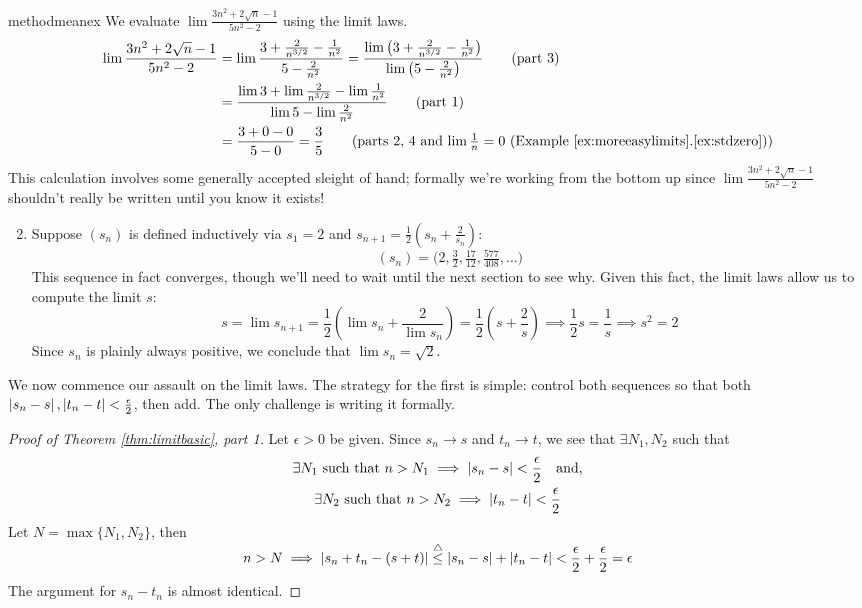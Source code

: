 \begin{examples}{}{methodmeanex}
\exstart We evaluate $\lim\frac{3n^2+2\sqrt n-1}{5n^2-2}$ using the limit laws.
\begin{align*}
\lim\frac{3n^2+2\sqrt n-1}{5n^2-2}&=\lim\frac{3+\frac 2{n^{3/2}}-\frac 1{n^2}}{5-\frac 2{n^2}} =\frac{\lim\left(3+\frac 2{n^{3/2}}-\frac 1{n^2}\right)}{\lim\left(5-\frac 2{n^2}\right)}\tag{part 3}\\
&=\frac{\lim 3+\lim\frac 2{n^{3/2}}-\lim\frac 1{n^2}}{\lim 5-\lim\frac 2{n^2}}\tag{part 1}\\
&=\frac{3+0-0}{5-0}=\frac 35\tag*{(parts 2, 4 and $\lim\frac 1n=0$ (Example \ref*{ex:moreeasylimits}.\ref{ex:stdzero}))}
\end{align*}
This calculation involves some generally accepted sleight of hand; formally we're working from the bottom up since $\lim\frac{3n^2+2\sqrt n-1}{5n^2-2}$ shouldn't really be written until you know it exists!

\goodbreak

\begin{enumerate}\setcounter{enumi}{1}
  \item\label{ex:methodmeanex2} Suppose $(s_n)$ is defined inductively via $s_1=2$ and $s_{n+1}=\frac 12(s_n+\frac 2{s_n})$:
\[(s_n)=\bigl(2,\tfrac 32,\tfrac{17}{12},\tfrac{577}{408},\ldots\bigr)\]
This sequence in fact converges, though we'll need to wait until the next section to see why. Given this fact, the limit laws allow us to compute the limit $s$:
\[s=\lim s_{n+1}=\frac 12\left(\lim s_n+\frac 2{\lim s_n}\right) =\frac 12\left(s+\frac 2s\right) \implies \frac 12s=\frac 1s\implies s^2=2\]
Since $s_n$ is plainly always positive, we conclude that $\lim s_n=\sqrt 2$.
\end{enumerate}
\end{examples}

\medskip

We now commence our assault on the limit laws. The strategy for the first is simple: control both sequences so that both $\left| s_n-s\right|,\left| t_n-t\right|<\frac\epsilon 2$, then add. The only challenge is writing it formally.

\begin{proof}[Proof of Theorem \ref{thm:limitbasic}, part 1]
	Let $\epsilon>0$ be given. Since $s_n\to s$ and $t_n\to t$, we see that $\exists N_1,N_2$ such that
		\begin{gather*}
			\exists N_1\text{ such that }n>N_1\implies \left| s_n-s\right|<\frac\epsilon 2
			\quad\text{and},\\
			\exists N_2\text{ such that }n>N_2\implies \left| t_n-t\right|<\frac\epsilon 2
		\end{gather*}
		Let $N=\max\{N_1,N_2\}$, then
		\[
			n>N\implies \left| s_n+t_n-(s+t)\right|\overset{\smash{\triangle}}{\le}\left| s_n-s\right|+\left| t_n-t\right|<\smash[t]{\frac\epsilon 2+\frac\epsilon 2}=\epsilon
		\]
		The argument for $s_n-t_n$ is almost identical.
\end{proof}

